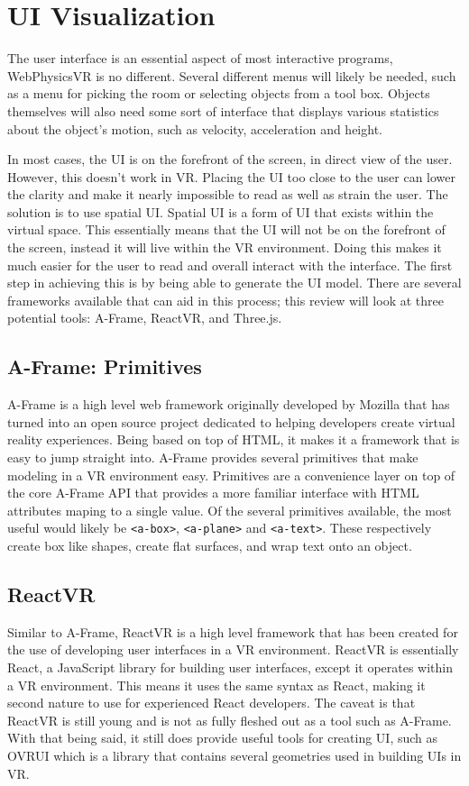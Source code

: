 \documentclass[draftclsnofoot,onecolumn,letterpaper,10pt]{article}
\begin{document}
\section{UI Visualization}
The user interface is an essential aspect of most interactive programs, WebPhysicsVR is no different. Several different menus will likely be needed, such as a menu for picking the room or selecting objects from a tool box. Objects themselves will also need some sort of interface that displays various statistics about the object's motion, such as velocity, acceleration and height. 

In most cases, the UI is on the forefront of the screen, in direct view of the user. However, this doesn't work in VR. Placing the UI too close to the user can lower the clarity and make it nearly impossible to read as well as strain the user. The solution is to use spatial UI. Spatial UI is a form of UI that exists within the virtual space. This essentially means that the UI will not be on the forefront of the screen, instead it will live within the VR environment. Doing this makes it much easier for the user to read and overall interact with the interface. The first step in achieving this is by being able to generate the UI model. There are several frameworks available that can aid in this process; this review will look at three potential tools: A-Frame, ReactVR, and Three.js.

\subsection{A-Frame: Primitives}
A-Frame is a high level web framework originally developed by Mozilla that has turned into an open source project dedicated to helping developers create virtual reality experiences. Being based on top of HTML, it makes it a framework that is easy to jump straight into. A-Frame provides several primitives that make modeling in a VR environment easy. Primitives are a convenience layer on top of the core A-Frame API that provides a more familiar interface with HTML attributes maping to a single value.\cite{aframe1} Of the several primitives available, the most useful would likely be \texttt{<a-box>}, \texttt{<a-plane>} and \texttt{<a-text>}. These respectively create box like shapes, create flat surfaces, and wrap text onto an object.\cite{aframe2, aframe3, aframe4}

\subsection{ReactVR}
Similar to A-Frame, ReactVR is a high level framework that has been created for the use of developing user interfaces in a VR environment. ReactVR is essentially React, a JavaScript library for building user interfaces, except it operates within a VR environment. This means it uses the same syntax as React, making it second nature to use for experienced React developers. The caveat is that ReactVR is still young and is not as fully fleshed out as a tool such as A-Frame. With that being said, it still does provide useful tools for creating UI, such as OVRUI which is a library that contains several geometries used in building UIs in VR.\cite{react1}
\end{document}
